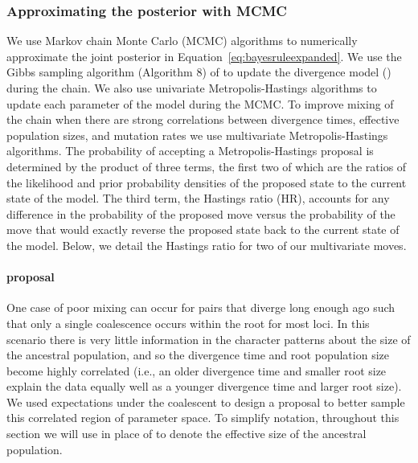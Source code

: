 \subsubsection{Approximating the posterior with MCMC}

We use Markov chain Monte Carlo (MCMC) algorithms to numerically approximate
the joint posterior in Equation~\ref{eq:bayesruleexpanded}.
We use the Gibbs sampling algorithm (Algorithm 8) of \citet{Neal2000}
to update the divergence model (\divtimemodel) during the chain.
We also use univariate Metropolis-Hastings algorithms
\citep{Metropolis1953,Hastings1970} to update each parameter of the model
during the MCMC.
To improve mixing of the chain when there are strong correlations between
divergence times, effective population sizes, and mutation rates we use
multivariate Metropolis-Hastings algorithms.
The probability of accepting a Metropolis-Hastings proposal is determined
by the product of three terms, the first two of which are the
ratios of the likelihood and prior probability densities of the proposed
state to the current state of the model.
The third term, the Hastings ratio (HR), accounts for any difference in the
probability of the proposed move versus the probability of the move that
would exactly reverse the proposed state back to the current state of the
model.
Below, we detail the Hastings ratio for two of our multivariate moves.

\paragraph{\timerootsizemixer proposal}
One case of poor mixing can occur for pairs that diverge long enough ago such
that only a single coalescence occurs within the root for most loci.
In this scenario there is very little information in the character patterns
about the size of the ancestral population, and so the divergence time and root
population size become highly correlated (i.e., an older divergence time and
smaller root size explain the data equally well as a younger divergence time
and larger root size).
We used expectations under the coalescent to design a proposal to better sample
this correlated region of parameter space.
To simplify notation, throughout this section we will use
\sepopsize[\rootpopindex] in place of \epopsize[\rootpopindex] to denote the
effective size of the ancestral population.

